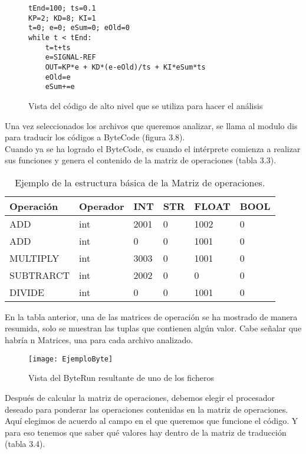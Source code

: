 \begin{figure}[H]
\centering
\begin{BVerbatim}
tEnd=100; ts=0.1
KP=2; KD=8; KI=1
t=0; e=0; eSum=0; eOld=0
while t < tEnd:
	t=t+ts
	e=SIGNAL-REF
	OUT=KP*e + KD*(e-eOld)/ts + KI*eSum*ts
	eOld=e
	eSum+=e 
\end{BVerbatim}
\caption{Vista del código de alto nivel que se utiliza para hacer el análisis}
\end{figure}


Una vez seleccionados los archivos que queremos analizar, se llama al modulo dis para traducir los códigos a ByteCode (figura 3.8).\\
Cuando ya se ha logrado el ByteCode, es cuando el intérprete comienza a realizar sus funciones y genera el contenido de la matriz de operaciones (tabla 3.3).

\begin{table}[H]
\begin{center}
\begin{tabular}{|l|l|l|l|l|l|}
\hline
Operación & Operador & INT & STR & FLOAT & BOOL \\
\hline \hline
ADD & int & 2001 & 0 & 1002 & 0\\ \hline
ADD & int & 0 & 0 & 1001 & 0 \\ \hline
MULTIPLY & int & 3003 & 0 & 1001 & 0 \\ \hline
SUBTRARCT & int & 2002 & 0 & 0 & 0 \\ \hline
DIVIDE & int & 0 & 0 & 1001 & 0 \\ \hline
\end{tabular}
\caption{Ejemplo de la estructura básica de la Matriz de operaciones.}

\label{tabla:sencilla}
\end{center}
\end{table}

En la tabla anterior, una de las matrices de operación se ha mostrado de manera resumida, solo se muestran las tuplas que contienen algún valor. Cabe señalar que habría n Matrices, una para cada archivo analizado.

\begin{figure}[H]
\centering
\texttt{[image: EjemploByte]}
\caption{Vista del ByteRun resultante de uno de los ficheros}
\end{figure}

Después de calcular la matriz de operaciones, debemos elegir el procesador deseado para ponderar las operaciones contenidas en la matriz de operaciones. Aquí elegimos de acuerdo al campo en el que queremos que funcione el código. Y para eso tenemos que saber qué valores hay dentro de la matriz de traducción (tabla 3.4).

